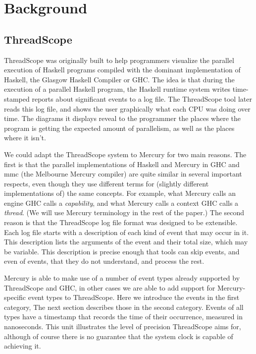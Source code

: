 \section{Background}
\label{sec:background}

\subsection{ThreadScope}

ThreadScope was originally built
to help programmers visualize the parallel execution of Haskell programs
compiled with the dominant implementation of Haskell,
the Glasgow Haskell Compiler or GHC.
The idea is that during the execution of a parallel Haskell program,
the Haskell runtime system writes time-stamped reports
about significant events to a log file.
The ThreadScope tool later reads this log file,
and shows the user graphically what each CPU was doing over time.
The diagrams it displays reveal to the programmer
the places where the program is getting the expected amount of parallelism,
as well as the places where it isn't.

We could adapt the ThreadScope system to Mercury for two main reasons.
The first is that the parallel implementations of Haskell and Mercury
in GHC and mmc (the Melbourne Mercury compiler)
are quite similar in several important respects,
even though they use different terms for
(slightly different implementations of) the same concepts.
For example, what Mercury calls an engine GHC calls a \emph{capability},
and what Mercury calls a context GHC calls a \emph{thread}.
(We will use Mercury terminology in the rest of the paper.)
The second reason is that
the ThreadScope log file format was designed to be extensible.
Each log file starts with a description
of each kind of event that may occur in it.
This description lists the arguments of the event and their total size,
which may be variable.
This description is precise enough that tools 
can skip events, and even of events, that they do not understand,
and process the rest.

Mercury is able to make use of a number of event types already supported by
ThreadScope and GHC,
in other cases we are able to add support for Mercury-specific event types to
ThreadScope.
Here we introduce the events in the first category,
The next section describes those in the second category.
Events of all types have a timestamp
that records the time of their occurrence, measured in nanoseconds.
This unit illustrates the level of precision ThreadScope aims for,
although of course there is no guarantee
that the system clock is capable of achieving it.

